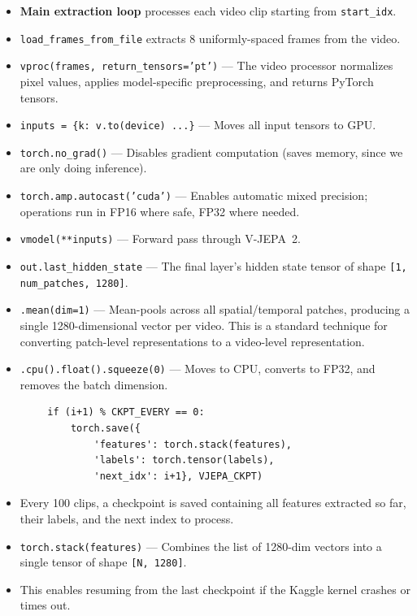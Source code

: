 \begin{explanation}
\begin{itemize}[nosep]
  \item \textbf{Main extraction loop} processes each video clip starting from \texttt{start\_idx}.
  \item \texttt{load\_frames\_from\_file} extracts 8 uniformly-spaced frames from the video.
  \item \texttt{vproc(frames, return\_tensors='pt')} --- The video processor normalizes pixel values, applies model-specific preprocessing, and returns PyTorch tensors.
  \item \texttt{inputs = \{k: v.to(device) ...\}} --- Moves all input tensors to GPU.
  \item \texttt{torch.no\_grad()} --- Disables gradient computation (saves memory, since we are only doing inference).
  \item \texttt{torch.amp.autocast('cuda')} --- Enables automatic mixed precision; operations run in FP16 where safe, FP32 where needed.
  \item \texttt{vmodel(**inputs)} --- Forward pass through V-JEPA~2.
  \item \texttt{out.last\_hidden\_state} --- The final layer's hidden state tensor of shape \texttt{[1, num\_patches, 1280]}.
  \item \texttt{.mean(dim=1)} --- Mean-pools across all spatial/temporal patches, producing a single 1280-dimensional vector per video. This is a standard technique for converting patch-level representations to a video-level representation.
  \item \texttt{.cpu().float().squeeze(0)} --- Moves to CPU, converts to FP32, and removes the batch dimension.
\end{itemize}
\end{explanation}

\begin{lstlisting}
        if (i+1) % CKPT_EVERY == 0:
            torch.save({
                'features': torch.stack(features),
                'labels': torch.tensor(labels),
                'next_idx': i+1}, VJEPA_CKPT)
\end{lstlisting}

\begin{explanation}
\begin{itemize}[nosep]
  \item Every 100 clips, a checkpoint is saved containing all features extracted so far, their labels, and the next index to process.
  \item \texttt{torch.stack(features)} --- Combines the list of 1280-dim vectors into a single tensor of shape \texttt{[N, 1280]}.
  \item This enables resuming from the last checkpoint if the Kaggle kernel crashes or times out.
\end{itemize}
\end{explanation}

